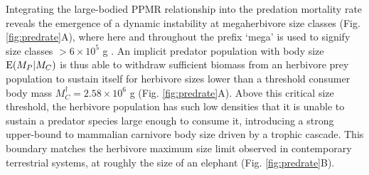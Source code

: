 \documentclass[11pt]{article}
\begin{document}
Integrating the large-bodied PPMR relationship into the predation mortality rate reveals the emergence of a dynamic instability at megaherbivore size classes (Fig. \ref{fig:predrate}A), where here and throughout the prefix `mega' is used to signify size classes $>6\times10^5$ g \citep{Hayward2005}.
An implicit predator population with body size ${\rm E}(M_P|M_C)$ is thus able to withdraw sufficient biomass from an herbivore prey population to sustain itself for herbivore sizes lower than a threshold consumer body mass $M_C^\dagger = 2.58\times 10^6$ g (Fig. \ref{fig:predrate}A).
Above this critical size threshold, the herbivore population has such low densities that it is unable to sustain a predator species large enough to consume it, introducing a strong upper-bound to mammalian carnivore body size driven by a trophic cascade.
This boundary matches the herbivore maximum size limit observed in contemporary terrestrial systems, at roughly the size of an elephant \citep{Sinclair2003} (Fig. \ref{fig:predrate}B).
\end{document}
